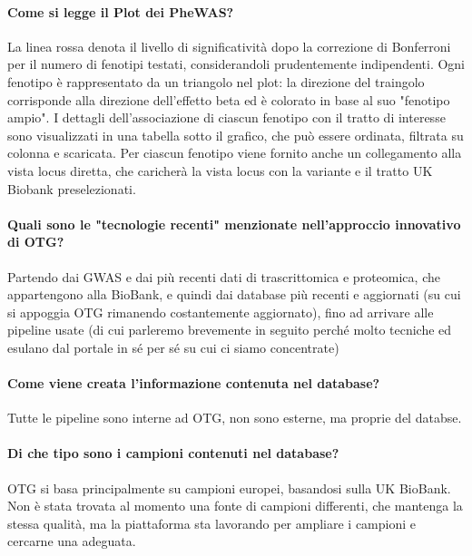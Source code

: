 \documentclass{article}
\begin{document}
\paragraph{Come si legge il Plot dei PheWAS?}
La linea rossa denota il livello di significatività dopo la correzione di Bonferroni per il numero di fenotipi testati, considerandoli prudentemente indipendenti. Ogni fenotipo è rappresentato da un triangolo nel plot: la direzione del traingolo corrisponde alla direzione dell'effetto beta ed è colorato in base al suo "fenotipo ampio". I dettagli dell'associazione di ciascun fenotipo con il tratto di interesse sono visualizzati in una tabella sotto il grafico, che può essere ordinata, filtrata su colonna e scaricata. Per ciascun fenotipo viene fornito anche un collegamento alla vista locus diretta, che caricherà la vista locus con la variante e il tratto UK Biobank preselezionati.
\paragraph{Quali sono le "tecnologie recenti" menzionate nell'approccio innovativo di OTG?}
Partendo dai GWAS e dai più recenti dati di trascrittomica e proteomica, che appartengono alla BioBank, e quindi dai database più recenti e aggiornati (su cui si appoggia OTG rimanendo costantemente aggiornato), fino ad arrivare alle pipeline usate (di cui parleremo brevemente in seguito perché molto tecniche ed esulano dal portale in sé per sé su cui ci siamo concentrate)
\paragraph{Come viene creata l'informazione contenuta nel database?}
Tutte le pipeline sono interne ad OTG, non sono esterne, ma proprie del databse.
\paragraph{Di che tipo sono i campioni contenuti nel database?}
OTG si basa principalmente su campioni europei, basandosi sulla UK BioBank. Non è stata trovata al momento una fonte di campioni differenti, che mantenga la stessa qualità, ma la piattaforma sta lavorando per ampliare i campioni e cercarne una adeguata.
\end{document}
